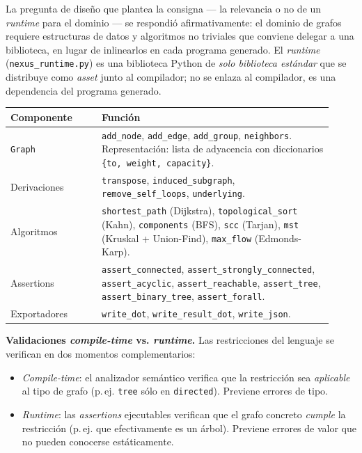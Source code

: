 \documentclass[11pt,a4paper]{article}
\newcommand{\code}[1]{\texttt{#1}}
\begin{document}
La pregunta de diseño que plantea la consigna --- la relevancia o no de un
\emph{runtime} para el dominio --- se respondió afirmativamente: el dominio de
grafos requiere estructuras de datos y algoritmos no triviales que conviene
delegar a una biblioteca, en lugar de inlinearlos en cada programa generado. El
\emph{runtime} (\code{nexus\_runtime.py}) es una biblioteca Python de
\emph{solo biblioteca estándar} que se distribuye como \emph{asset} junto al
compilador; no se enlaza al compilador, es una dependencia del programa
generado.

\begin{center}
\begin{tabular}{@{}p{0.26\linewidth}p{0.66\linewidth}@{}}
\toprule
\textbf{Componente} & \textbf{Función} \\
\midrule
\code{Graph}   & \code{add\_node}, \code{add\_edge}, \code{add\_group},
                 \code{neighbors}. Representación: lista de adyacencia con
                 diccionarios \code{\{to, weight, capacity\}}. \\
Derivaciones   & \code{transpose}, \code{induced\_subgraph},
                 \code{remove\_self\_loops}, \code{underlying}. \\
Algoritmos     & \code{shortest\_path} (Dijkstra), \code{topological\_sort}
                 (Kahn), \code{components} (BFS), \code{scc} (Tarjan),
                 \code{mst} (Kruskal + Union-Find), \code{max\_flow}
                 (Edmonds-Karp). \\
Assertions     & \code{assert\_connected}, \code{assert\_strongly\_connected},
                 \code{assert\_acyclic}, \code{assert\_reachable},
                 \code{assert\_tree}, \code{assert\_binary\_tree},
                 \code{assert\_forall}. \\
Exportadores   & \code{write\_dot}, \code{write\_result\_dot},
                 \code{write\_json}. \\
\bottomrule
\end{tabular}
\end{center}

\textbf{Validaciones \emph{compile-time} vs. \emph{runtime}.} Las restricciones
del lenguaje se verifican en dos momentos complementarios:
\begin{itemize}[noitemsep]
  \item \emph{Compile-time}: el analizador semántico verifica que la
        restricción sea \emph{aplicable} al tipo de grafo (p.\,ej. \code{tree}
        sólo en \code{directed}). Previene errores de tipo.
  \item \emph{Runtime}: las \emph{assertions} ejecutables verifican que el grafo
        concreto \emph{cumple} la restricción (p.\,ej. que efectivamente es un
        árbol). Previene errores de valor que no pueden conocerse estáticamente.
\end{itemize}
\end{document}
